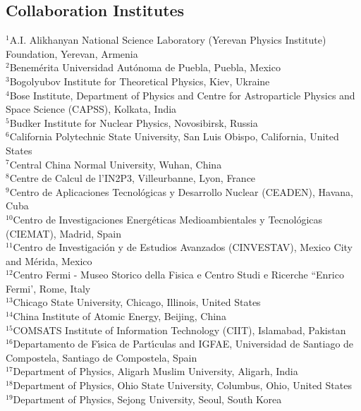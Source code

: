 \begin{flushleft}
\section*{Collaboration Institutes}
\renewcommand\theenumi{\arabic{enumi}~}

$^{1}$A.I. Alikhanyan National Science Laboratory (Yerevan Physics Institute) Foundation, Yerevan, Armenia
\\
$^{2}$Benem\'{e}rita Universidad Aut\'{o}noma de Puebla, Puebla, Mexico
\\
$^{3}$Bogolyubov Institute for Theoretical Physics, Kiev, Ukraine
\\
$^{4}$Bose Institute, Department of Physics 
and Centre for Astroparticle Physics and Space Science (CAPSS), Kolkata, India
\\
$^{5}$Budker Institute for Nuclear Physics, Novosibirsk, Russia
\\
$^{6}$California Polytechnic State University, San Luis Obispo, California, United States
\\
$^{7}$Central China Normal University, Wuhan, China
\\
$^{8}$Centre de Calcul de l'IN2P3, Villeurbanne, Lyon, France
\\
$^{9}$Centro de Aplicaciones Tecnol\'{o}gicas y Desarrollo Nuclear (CEADEN), Havana, Cuba
\\
$^{10}$Centro de Investigaciones Energ\'{e}ticas Medioambientales y Tecnol\'{o}gicas (CIEMAT), Madrid, Spain
\\
$^{11}$Centro de Investigaci\'{o}n y de Estudios Avanzados (CINVESTAV), Mexico City and M\'{e}rida, Mexico
\\
$^{12}$Centro Fermi - Museo Storico della Fisica e Centro Studi e Ricerche ``Enrico Fermi', Rome, Italy
\\
$^{13}$Chicago State University, Chicago, Illinois, United States
\\
$^{14}$China Institute of Atomic Energy, Beijing, China
\\
$^{15}$COMSATS Institute of Information Technology (CIIT), Islamabad, Pakistan
\\
$^{16}$Departamento de F\'{\i}sica de Part\'{\i}culas and IGFAE, Universidad de Santiago de Compostela, Santiago de Compostela, Spain
\\
$^{17}$Department of Physics, Aligarh Muslim University, Aligarh, India
\\
$^{18}$Department of Physics, Ohio State University, Columbus, Ohio, United States
\\
$^{19}$Department of Physics, Sejong University, Seoul, South Korea

\end{flushleft}
